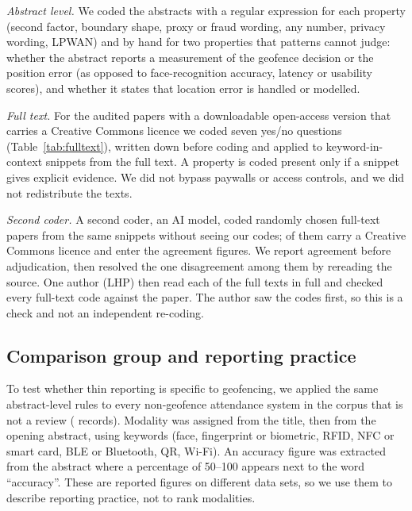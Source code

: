 \documentclass[preprint,12pt]{elsarticle}
\begin{document}
\emph{Abstract level.} We coded the abstracts with a regular expression for each property (second factor, boundary shape, proxy or fraud wording, any number, privacy wording, LPWAN) and by hand for two properties that patterns cannot judge: whether the abstract reports a measurement of the geofence decision or the position error (as opposed to face-recognition accuracy, latency or usability scores), and whether it states that location error is handled or modelled.

\emph{Full text.} For the audited papers with a downloadable open-access version that carries a Creative Commons licence we coded seven yes/no questions (Table~\ref{tab:fulltext}), written down before coding and applied to keyword-in-context snippets from the full text. A property is coded present only if a snippet gives explicit evidence. We did not bypass paywalls or access controls, and we did not redistribute the texts.

\emph{Second coder.} A second coder, an AI model, coded \agNAll{} randomly chosen full-text papers from the same snippets without seeing our codes; \agN{} of them carry a Creative Commons licence and enter the agreement figures. We report agreement before adjudication, then resolved the one disagreement among them by rereading the source. One author (LHP) then read each of the \ftN{} full texts in full and checked every full-text code against the paper. The author saw the codes first, so this is a check and not an independent re-coding.

\subsection{Comparison group and reporting practice}
To test whether thin reporting is specific to geofencing, we applied the same abstract-level rules to every non-geofence attendance system in the corpus that is not a review (\nOthers{} records). Modality was assigned from the title, then from the opening abstract, using keywords (face, fingerprint or biometric, RFID, NFC or smart card, BLE or Bluetooth, QR, Wi-Fi). An accuracy figure was extracted from the abstract where a percentage of 50--100 appears next to the word ``accuracy''. These are reported figures on different data sets, so we use them to describe reporting practice, not to rank modalities.
\end{document}
